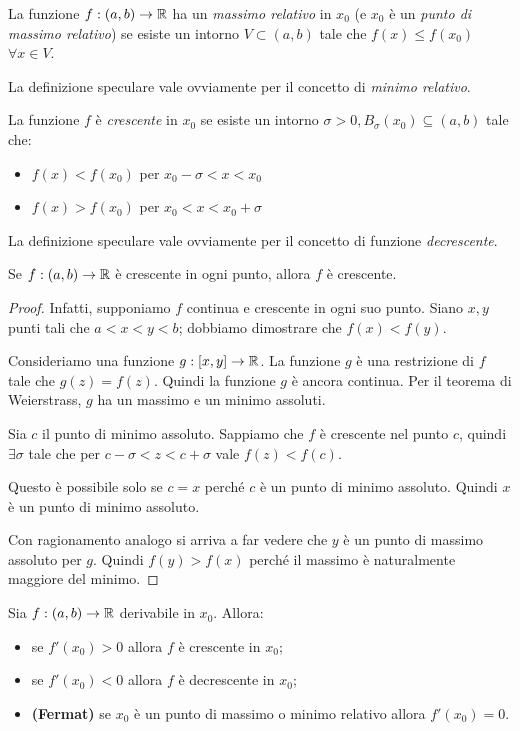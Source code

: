 \begin{definition}
La funzione $f: (a,b) \to \mathbb R$ ha un \emph{massimo relativo} in $x_0$ (e $x_0$ è un \emph{punto di massimo relativo}) se esiste un intorno $V \subset (a,b)$ tale che $f(x) \le f(x_0)$ $\forall x \in V$.
\end{definition}

La definizione speculare vale ovviamente per il concetto di \emph{minimo relativo}.

\begin{definition}
La funzione $f$ è \emph{crescente} in $x_0$ se esiste un intorno $\sigma > 0, B_\sigma (x_0) \subseteq (a,b)$ tale che:
\begin{itemize}
\item $f(x) < f(x_0)$ per $x_0 - \sigma < x < x_0$
\item $f(x) > f(x_0)$ per $x_0 < x < x_0 + \sigma$
\end{itemize}
\end{definition}

La definizione speculare vale ovviamente per il concetto di funzione \emph{decrescente}.

\begin{remark}
Se $f: (a,b) \to \mathbb R$ è crescente in ogni punto, allora $f$ è crescente.
\end{remark}

\begin{proof}
Infatti, supponiamo $f$ continua e crescente in ogni suo punto. Siano $x, y$ punti tali che $a < x < y < b$; dobbiamo dimostrare che $f(x) < f(y)$.

Consideriamo una funzione $g: [x, y] \to \mathbb R$. La funzione $g$ è una restrizione di $f$ tale che $g(z) = f(z)$. Quindi la funzione $g$ è ancora continua. Per il teorema di Weierstrass, $g$ ha un massimo e un minimo assoluti.

Sia $c$ il punto di minimo assoluto. Sappiamo che $f$ è crescente nel punto $c$, quindi $\exists \sigma$ tale che per $c - \sigma < z < c + \sigma$ vale $f(z) < f(c)$.

Questo è possibile solo se $c = x$ perché $c$ è un punto di minimo assoluto. Quindi $x$ è un punto di minimo assoluto.

Con ragionamento analogo si arriva a far vedere che $y$ è un punto di massimo assoluto per $g$. Quindi $f(y) > f(x)$ perché il massimo è naturalmente maggiore del minimo.
\end{proof}

\begin{theorem}
Sia $f: (a,b) \to \mathbb R$ derivabile in $x_0$. Allora:
\begin{itemize}
\item se $f'(x_0) > 0$ allora $f$ è crescente in $x_0$;
\item se $f'(x_0) < 0$ allora $f$ è decrescente in $x_0$;
\item {\bfseries(Fermat)} se $x_0$ è un punto di massimo o minimo relativo allora $f'(x_0)=0$.
\end{itemize}
\end{theorem}

